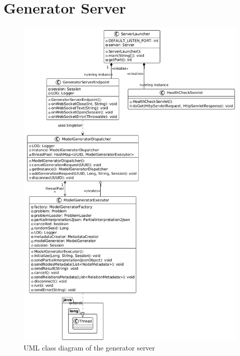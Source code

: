\clearpage\section{Generator Server}
\begin{figure}[h!]
		\includegraphics[scale=0.5]{include/imgs/generator_server_UML.png}
		\caption{UML class diagram of the generator server}
		\label{generatorserveruml}
\end{figure}